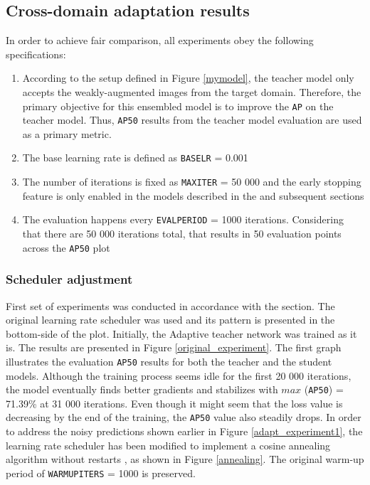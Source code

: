 \documentclass[english, 12pt, a4paper, elec, utf8, a-1b, online]{aaltothesis}
\begin{document}
\subsection{Cross-domain adaptation results}

In order to achieve fair comparison, all experiments obey the following specifications:
\begin{enumerate}
\item According to the setup defined in Figure \ref{mymodel}, the teacher model only accepts the weakly-augmented images from the target domain. Therefore, the primary objective for this ensembled model is to improve the \texttt{AP} on the teacher model. Thus, \texttt{AP50} results from the teacher model evaluation are used as a primary metric. 
\item The base learning rate is defined as \texttt{BASE\textunderscore LR} = 0.001
\item The number of iterations is fixed as \texttt{MAX\textunderscore ITER} = 50 000 and the early stopping feature is only enabled in the models described in the  and subsequent sections 
\item The evaluation happens every \texttt{EVAL\textunderscore PERIOD} = 1000 iterations. Considering that there are 50 000 iterations total, that results in 50 evaluation points across the \texttt{AP50} plot
\end{enumerate}  
\subsubsection{Scheduler adjustment}
\label{scheduler_section} 
First set of experiments was conducted in accordance with the  section. The original learning rate scheduler was used and its pattern is presented in the bottom-side of the plot. Initially, the Adaptive teacher network was trained as it is. The results are presented in Figure \ref{original_experiment}. The first graph illustrates the evaluation \texttt{AP50} results for both the teacher and the student models. Although the training process seems idle for the first 20 000 iterations, the model eventually finds better gradients and stabilizes with $max$ (\texttt{AP50}) = 71.39\% at 31 000 iterations. Even though it might seem that the loss value is decreasing by the end of the training, the \texttt{AP50} value also steadily drops. In order to address the noisy predictions shown earlier in Figure \ref{adapt_experiment1}, the learning rate scheduler has been modified to implement a cosine annealing algorithm without restarts \cite{Loshchilov2016}, as shown in Figure \ref{annealing}. The original warm-up period of \texttt{WARMUP\textunderscore ITERS} = 1000 is preserved. 
\end{document}
